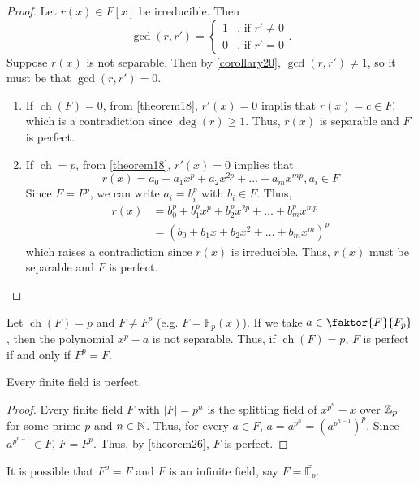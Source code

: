 \documentclass[11pt]{article}
\newcommand{\quotient}[2]{\faktor{#1}{#2}}
\DeclareMathOperator{\ch}{ch}
\begin{document}
\begin{proof}
Let $r(x) \in F[x]$ be irreducible. Then
\begin{equation*}
\gcd(r,r') =
\begin{cases}
1 & \text{, if $r' \neq 0$}\\
0 & \text{, if $r' = 0$}
\end{cases}.
\end{equation*}
Suppose $r(x)$ is not separable. Then by \cref{corollary20}, $\gcd(r,r') \neq
1$, so it must be that $\gcd(r,r') = 0$.
\begin{enumerate}
\item If $\ch(F) = 0$, from \cref{theorem18}, $r'(x) = 0$ implis that $r(x) = c
\in F$, which is a contradiction since $\deg(r) \geq 1$. Thus, $r(x)$ is
separable and $F$ is perfect.
\item If $\ch = p$, from \cref{theorem18}, $r'(x) = 0$ implies that
\begin{equation*}
r(x) = a_0 + a_1x^p + a_2x^{2p} + \dots + a_mx^{mp}, a_i \in F
\end{equation*}
Since $F = F^p$, we can write $a_i = b_i^p$ with $b_i \in F$. Thus,
\begin{align*}
r(x) &= b_0^p + b^p_1x^p + b^p_2x^{2p} + \dots + b^p_mx^{mp}\\
&= (b_0 + b_1x + b_2x^2 + \dots + b_mx^m)^p
\end{align*}
which raises a contradiction since $r(x)$ is irreducible. Thus, $r(x)$ must be
separable and $F$ is perfect.
\end{enumerate}
\end{proof}
\begin{remark}
Let $\ch(F) = p$ and $F \neq F^p$ (e.g. $F = \mathbb{F}_p(x)$). If we take
$a \in \quotient{F}{F_p}$, then the polynomial $x^p -a$ is not separable. Thus,
if $\ch(F) = p$, $F$ is perfect if and only if $F^p=F$.
\end{remark}
\begin{corollary}
Every finite field is perfect.
\label{corollary27}
\end{corollary}
\begin{proof}
Every finite field $F$ with $|F|=p^n$ is the splitting field of $x^{p^n} - x$
over $\mathbb{Z}_p$ for some prime $p$ and $n \in \mathbb{N}$. Thus, for every $a \in F$,
$a = a^{p^n} = (a^{p^{n-1}})^p$. Since $a^{p^{n-1}} \in F$, $F = F^p$. Thus, by
\cref{theorem26}, $F$ is perfect.
\end{proof}
\begin{remark}
It is possible that $F^p = F$ and $F$ is an infinite field, say $F =
\bar{\mathbb{F}_p}$.
\end{remark}
\end{document}
